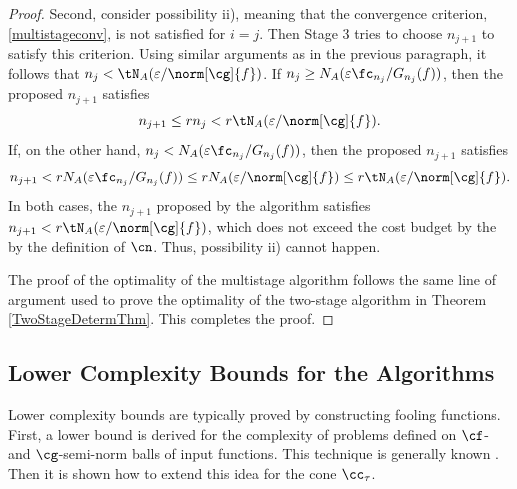 \documentclass[]{elsarticle}
\theoremstyle{definition}
\theoremstyle{remark}
\begin{document}
\begin{proof}
Second, consider possibility ii), meaning that the convergence criterion, \eqref{multistageconv}, is not satisfied for $i=j$.  Then Stage 3 tries to choose $n_{j+1}$ to satisfy this criterion.  Using similar arguments as in the previous paragraph, it follows that $n_j < \tN_A(\varepsilon/\norm[\cg]{f})$. 
If $n_j \ge N_{A}(\varepsilon \fc_{n_j}/G_{n_j}(f))$, then the proposed $n_{j+1}$ satisfies
\begin{equation*}
n_{j+1} \le r  n_j < r \tN_{A}(\varepsilon/\norm[\cg]{f}).
\end{equation*}
If, on the other hand, $n_j < N_{A}(\varepsilon \fc_{n_j}/G_{n_j}(f))$, then the proposed $n_{j+1}$ satisfies
\begin{equation*}
n_{j+1} < r  N_{A}(\varepsilon \fc_{n_j}/G_{n_j}(f)) \le r  N_{A}(\varepsilon/\norm[\cg]{f}) \le r \tN_{A}(\varepsilon/\norm[\cg]{f}).
\end{equation*}
In both cases, the $n_{j+1}$ proposed by the algorithm satisfies $n_{j+1} < r \tN_{A}(\varepsilon/\norm[\cg]{f})$, which does not exceed the cost budget by the  by the definition of $\cn$.  Thus, possibility ii) cannot happen.

The proof of the optimality of the multistage algorithm follows the same line of argument used to prove the optimality of the two-stage algorithm in Theorem \ref{TwoStageDetermThm}.  This completes the proof.
\end{proof}

\subsection{Lower Complexity Bounds for the Algorithms}
Lower complexity bounds are typically proved by constructing fooling functions.  First, a lower bound is derived for the complexity of problems defined on $\cf$- and $\cg$-semi-norm balls of input functions.  This technique is generally known \cite{???}.  Then it is shown how to extend this idea for the cone $\cc_{\tau}$.  
\end{document}
